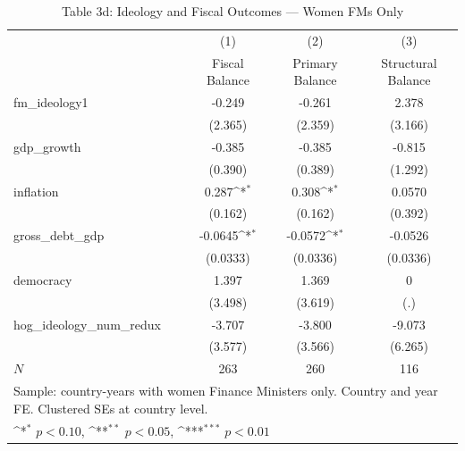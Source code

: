 \begin{table}[htbp]\centering
\def\sym#1{\ifmmode^{#1}\else\(^{#1}\)\fi}
\caption{Table 3d: Ideology and Fiscal Outcomes — Women FMs Only}
\begin{tabular}{l*{3}{c}}
\hline\hline
            &\multicolumn{1}{c}{(1)}&\multicolumn{1}{c}{(2)}&\multicolumn{1}{c}{(3)}\\
            &\multicolumn{1}{c}{Fiscal Balance}&\multicolumn{1}{c}{Primary Balance}&\multicolumn{1}{c}{Structural Balance}\\
\hline
fm\_ideology1&      -0.249         &      -0.261         &       2.378         \\
            &     (2.365)         &     (2.359)         &     (3.166)         \\
[1em]
gdp\_growth  &      -0.385         &      -0.385         &      -0.815         \\
            &     (0.390)         &     (0.389)         &     (1.292)         \\
[1em]
inflation   &       0.287\sym{*}  &       0.308\sym{*}  &      0.0570         \\
            &     (0.162)         &     (0.162)         &     (0.392)         \\
[1em]
gross\_debt\_gdp&     -0.0645\sym{*}  &     -0.0572\sym{*}  &     -0.0526         \\
            &    (0.0333)         &    (0.0336)         &    (0.0336)         \\
[1em]
democracy   &       1.397         &       1.369         &           0         \\
            &     (3.498)         &     (3.619)         &         (.)         \\
[1em]
hog\_ideology\_num\_redux&      -3.707         &      -3.800         &      -9.073         \\
            &     (3.577)         &     (3.566)         &     (6.265)         \\
\hline
\(N\)       &         263         &         260         &         116         \\
\hline\hline
\multicolumn{4}{l}{\footnotesize Sample: country-years with women Finance Ministers only.  Country and year FE. Clustered SEs at country level.}\\
\multicolumn{4}{l}{\footnotesize \sym{*} \(p<0.10\), \sym{**} \(p<0.05\), \sym{***} \(p<0.01\)}\\
\end{tabular}
\end{table}
